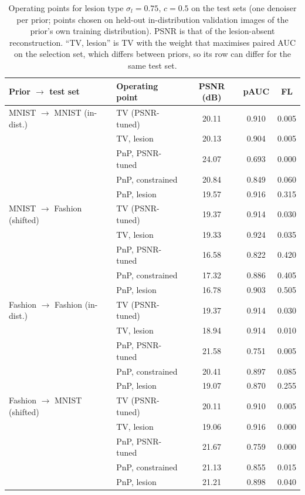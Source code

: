 \begin{table}[htbp]
\centering\small\setlength{\tabcolsep}{4pt}
\caption{Operating points for lesion type $\sigma_l=0.75$, $c=0.5$ on the test sets (one denoiser per prior; points chosen on
held-out in-distribution validation images of the prior's own training distribution). PSNR is that of the lesion-absent reconstruction. ``TV, lesion'' is TV with the weight
that maximises paired AUC on the selection set, which differs between priors, so its row can differ for the same test set.}\label{tab:oppoint}
\begin{tabular}{llccc}
\toprule
Prior $\to$ test set & Operating point & PSNR (dB) & pAUC & FL\\
\midrule
MNIST $\to$ MNIST (in-dist.)     & TV (PSNR-tuned)  & 20.11 & 0.910 & 0.005\\
                                 & TV, lesion       & 20.13 & 0.904 & 0.005\\
                                 & PnP, PSNR-tuned  & 24.07 & 0.693 & 0.000\\
                                 & PnP, constrained & 20.84 & 0.849 & 0.060\\
                                 & PnP, lesion      & 19.57 & 0.916 & 0.315\\
MNIST $\to$ Fashion (shifted)    & TV (PSNR-tuned)  & 19.37 & 0.914 & 0.030\\
                                 & TV, lesion       & 19.33 & 0.924 & 0.035\\
                                 & PnP, PSNR-tuned  & 16.58 & 0.822 & 0.420\\
                                 & PnP, constrained & 17.32 & 0.886 & 0.405\\
                                 & PnP, lesion      & 16.78 & 0.903 & 0.505\\
Fashion $\to$ Fashion (in-dist.) & TV (PSNR-tuned)  & 19.37 & 0.914 & 0.030\\
                                 & TV, lesion       & 18.94 & 0.914 & 0.010\\
                                 & PnP, PSNR-tuned  & 21.58 & 0.751 & 0.005\\
                                 & PnP, constrained & 20.41 & 0.897 & 0.085\\
                                 & PnP, lesion      & 19.07 & 0.870 & 0.255\\
Fashion $\to$ MNIST (shifted)    & TV (PSNR-tuned)  & 20.11 & 0.910 & 0.005\\
                                 & TV, lesion       & 19.06 & 0.916 & 0.000\\
                                 & PnP, PSNR-tuned  & 21.67 & 0.759 & 0.000\\
                                 & PnP, constrained & 21.13 & 0.855 & 0.015\\
                                 & PnP, lesion      & 21.21 & 0.898 & 0.040\\
\bottomrule
\end{tabular}
\end{table}

